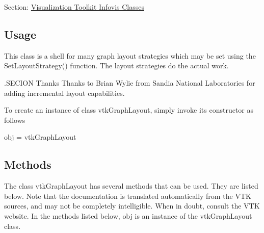 Section\-: \hyperlink{sec_vtkinfovis}{Visualization Toolkit Infovis Classes} \hypertarget{vtkwidgets_vtkxyplotwidget_Usage}{}\subsection{Usage}\label{vtkwidgets_vtkxyplotwidget_Usage}
This class is a shell for many graph layout strategies which may be set using the Set\-Layout\-Strategy() function. The layout strategies do the actual work.

.S\-E\-C\-I\-O\-N Thanks Thanks to Brian Wylie from Sandia National Laboratories for adding incremental layout capabilities.

To create an instance of class vtk\-Graph\-Layout, simply invoke its constructor as follows \begin{DoxyVerb}  obj = vtkGraphLayout
\end{DoxyVerb}
 \hypertarget{vtkwidgets_vtkxyplotwidget_Methods}{}\subsection{Methods}\label{vtkwidgets_vtkxyplotwidget_Methods}
The class vtk\-Graph\-Layout has several methods that can be used. They are listed below. Note that the documentation is translated automatically from the V\-T\-K sources, and may not be completely intelligible. When in doubt, consult the V\-T\-K website. In the methods listed below, {\ttfamily obj} is an instance of the vtk\-Graph\-Layout class. 
